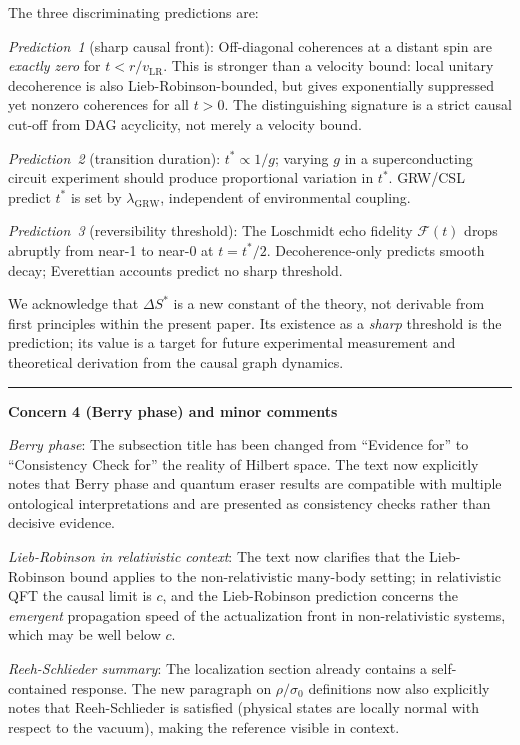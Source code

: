 \documentclass[11pt]{article}
\begin{document}
The three discriminating predictions are:

\emph{Prediction~1} (sharp causal front): Off-diagonal coherences at
a distant spin are \emph{exactly zero} for $t < r/v_{\mathrm{LR}}$.
This is stronger than a velocity bound: local unitary decoherence is
also Lieb-Robinson-bounded, but gives exponentially suppressed yet
nonzero coherences for all $t > 0$. The distinguishing signature is
a strict causal cut-off from DAG acyclicity, not merely a velocity
bound.

\emph{Prediction~2} (transition duration): $t^* \propto 1/g$; varying $g$
in a superconducting circuit experiment should produce proportional variation
in $t^*$. GRW/CSL predict $t^*$ is set by $\lambda_{\mathrm{GRW}}$,
independent of environmental coupling.

\emph{Prediction~3} (reversibility threshold): The Loschmidt echo fidelity
$\mathcal{F}(t)$ drops abruptly from near-1 to near-0 at $t = t^*/2$.
Decoherence-only predicts smooth decay; Everettian accounts predict no
sharp threshold.

We acknowledge that $\Delta S^*$ is a new constant of the theory, not
derivable from first principles within the present paper. Its existence as
a \emph{sharp} threshold is the prediction; its value is a target for
future experimental measurement and theoretical derivation from the
causal graph dynamics.

\bigskip\hrule\bigskip

\noindent\textbf{Concern 4 (Berry phase) and minor comments}

\emph{Berry phase}: The subsection title has been changed from ``Evidence for''
to ``Consistency Check for'' the reality of Hilbert space. The text now
explicitly notes that Berry phase and quantum eraser results are compatible
with multiple ontological interpretations and are presented as consistency
checks rather than decisive evidence.

\emph{Lieb-Robinson in relativistic context}: The text now clarifies that
the Lieb-Robinson bound applies to the non-relativistic many-body setting;
in relativistic QFT the causal limit is $c$, and the Lieb-Robinson prediction
concerns the \emph{emergent} propagation speed of the actualization front
in non-relativistic systems, which may be well below $c$.

\emph{Reeh-Schlieder summary}: The localization section already contains a
self-contained response. The new paragraph on $\rho/\sigma_0$ definitions
now also explicitly notes that Reeh-Schlieder is satisfied (physical states
are locally normal with respect to the vacuum), making the reference visible
in context.
\end{document}
